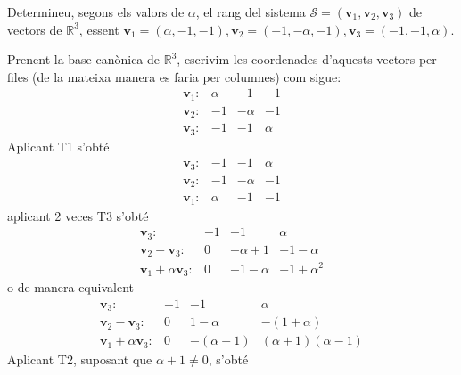 \begin{exercici}
Determineu, segons els valors de $\alpha $, el rang del sistema $%
\mathcal{S}=(\mathbf{v}_{1},\mathbf{v}_{2},\mathbf{v}_{3})$ de vectors de $%
\mathbb{R}^{3}$, essent $\mathbf{v}_{1}=(\alpha ,-1,-1),\mathbf{v}%
_{2}=(-1,-\alpha ,-1),\mathbf{v}_{3}=(-1,-1,\alpha )$.

\end{exercici}
\begin{solucio}
Prenent la base canònica de $\mathbb{R}^{3}$, escrivim les coordenades
d’aquests vectors per files (de la mateixa manera es faria per columnes) com
sigue:%
\begin{equation*}
\begin{array}{rrrr}
\mathbf{v}_{1}: & \alpha & -1 & -1 \\
\mathbf{v}_{2}: & -1 & -\alpha & -1 \\
\mathbf{v}_{3}: & -1 & -1 & \alpha%
\end{array}%
\end{equation*}%
Aplicant T1 s’obté%
\begin{equation*}
\begin{array}{rrrr}
\mathbf{v}_{3}: & -1 & -1 & \alpha \\
\mathbf{v}_{2}: & -1 & -\alpha & -1 \\
\mathbf{v}_{1}: & \alpha & -1 & -1%
\end{array}%
\end{equation*}%
aplicant 2 veces T3 s’obté%
\begin{equation*}
\begin{array}{rrrr}
\mathbf{v}_{3}: & -1 & -1 & \alpha \\
\mathbf{v}_{2}-\mathbf{v}_{3}: & 0 & -\alpha +1 & -1-\alpha \\
\mathbf{v}_{1}+\alpha \mathbf{v}_{3}: & 0 & -1-\alpha & -1+\alpha ^{2}%
\end{array}%
\end{equation*}%
o de manera equivalent%
\begin{equation*}
\begin{array}{rrrr}
\mathbf{v}_{3}: & -1 & -1 & \alpha \\
\mathbf{v}_{2}-\mathbf{v}_{3}: & 0 & 1-\alpha & -(1+\alpha ) \\
\mathbf{v}_{1}+\alpha \mathbf{v}_{3}: & 0 & -(\alpha +1) & (\alpha
+1)(\alpha -1)%
\end{array}%
\end{equation*}%
Aplicant T2, suposant que $\alpha +1\neq 0$, s’obté%
\begin{equation*}

\end{equation*}
\end{solucio}
